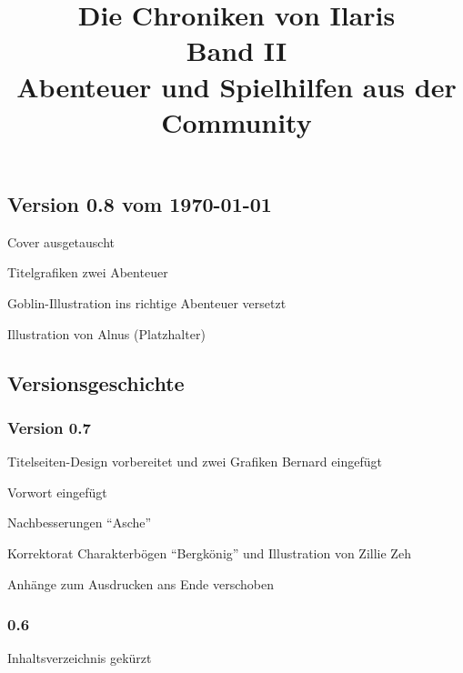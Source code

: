 \documentclass[openright]{Ilaris}
\title{Die Chroniken von Ilaris\\ Band II\\ Abenteuer und Spielhilfen aus der Community}
\begin{document}
\hauptteil
\titelseite{%
	\begin{centering}
		\titelbild{cover.jpg}
		\mbox{}
		\vspace{10cm}
		
		
	\end{centering}
}
\neueseite



\subsection*{Version 0.8 vom \today}
Cover ausgetauscht

Titelgrafiken zwei Abenteuer

Goblin-Illustration ins richtige Abenteuer versetzt

Illustration von Alnus (Platzhalter)

\subsection*{Versionsgeschichte}


\subsubsection*{Version 0.7}
Titelseiten-Design vorbereitet und zwei Grafiken Bernard eingefügt

Vorwort eingefügt

Nachbesserungen \enquote{Asche}

Korrektorat Charakterbögen \enquote{Bergkönig} und Illustration von Zillie Zeh

Anhänge zum Ausdrucken ans Ende verschoben


\subsubsection*{0.6}
Inhaltsverzeichnis gekürzt
\end{document}
